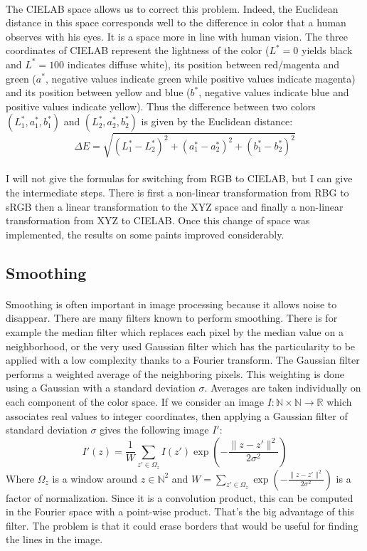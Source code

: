 \documentclass[11pt]{article}
\newcommand{\N}{\mathbb{N}}
\newcommand{\R}{\mathbb{R}}
\begin{document}
	\paragraph{}
	The CIELAB space \cite{cielab} allows us to correct this problem. Indeed, the Euclidean distance in this space corresponds well to the difference in color that a human observes with his eyes. It is a space more in line with human vision. The three coordinates of CIELAB represent the lightness of the color ($L^* = 0$ yields black and $L^* = 100$ indicates diffuse white), its position between red/magenta and green ($a^*$, negative values indicate green while positive values indicate magenta) and its position between yellow and blue ($b^*$, negative values indicate blue and positive values indicate yellow). Thus the difference between two colors $(L_1^*, a_1^*, b_1^*)$ and $(L_2^*, a_2^*, b_2^*)$ is given by the Euclidean distance:
	$$ \Delta E = \sqrt{(L_1^* - L_2^*)^2 + (a_1^* - a_2^*)^2 + (b_1^* - b_2^*)^2} $$
	
	\paragraph{}
	I will not give the formulas for switching from RGB to CIELAB, but I can give the intermediate steps. There is first a non-linear transformation from RBG to sRGB then a linear transformation to the XYZ space and finally a non-linear transformation from XYZ to CIELAB. Once this change of space was implemented, the results on some paints improved considerably.
	
	\subsection{Smoothing}
	
	\paragraph{}
	Smoothing is often important in image processing because it allows noise to disappear. There are many filters known to perform smoothing. There is for example the median filter which replaces each pixel by the median value on a neighborhood, or the very used Gaussian filter which has the particularity to be applied with a low complexity thanks to a Fourier transform. The Gaussian filter performs a weighted average of the neighboring pixels. This weighting is done using a Gaussian with a standard deviation $\sigma$. Averages are taken individually on each component of the color space. If we consider an image $I : \N \times \N \rightarrow \R$ which associates real values to integer coordinates, then applying a Gaussian filter of standard deviation $\sigma$ gives the following image $I'$:
	$$ I'(z) = \dfrac{1}{W} \sum_{z' \in \Omega_{z}} I(z') \exp \left( - \dfrac{\| z - z'\|^2}{2 \sigma^2} \right) $$
	Where $\Omega_{z}$ is a window around $z \in \N^2$ and $W = \sum_{z' \in \Omega_{z}} \exp \left( - \frac{\| z - z'\|^2}{2 \sigma^2} \right)$ is a factor of normalization. Since it is a convolution product, this can be computed in the Fourier space with a point-wise product. That's the big advantage of this filter. The problem is that it could erase borders that would be useful for finding the lines in the image.
	
\end{document}
